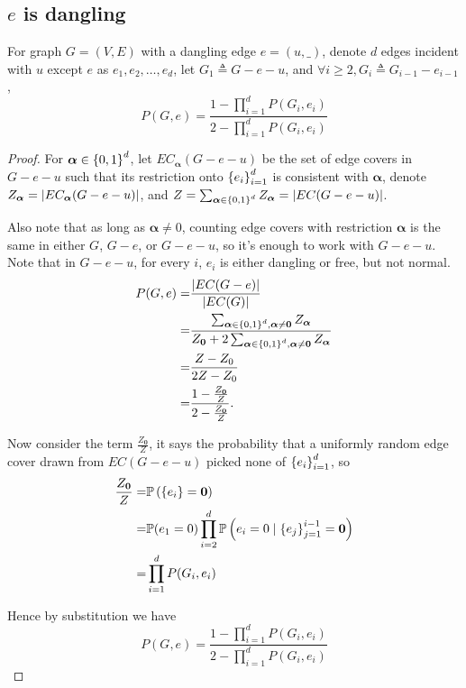 \subsection{$e$ is dangling}
\begin{lemma}
For graph $G=(V,E)$ with a dangling edge $e=(u,\_)$, denote $d$
edges incident with $u$ except $e$ as $e_1, e_2, \ldots, e_d$,
let $G_1 \triangleq G - e - u$, and $\forall i \geq 2, G_i \triangleq G_{i-1} - e_{i-1}$ ,
	\begin{equation}
		P(G, e) = \frac{1-\prod_{i=1}^d P(G_i, e_i)}{2 - \prod_{i=1}^d P(G_i, e_i)} %
		\label{propp3rg}
	\end{equation}
\end{lemma}
\begin{proof}
	For $\boldsymbol\alpha \in \left\{0,1\right\}^d$, let $EC_{\boldsymbol\alpha}(G-e-u)$ be the set of edge covers in $G-e-u$ such that its restriction onto $\left\{e_i\right\}_{i=1}^{d}$ is consistent with $\boldsymbol\alpha$, denote $Z_{\boldsymbol\alpha} = \left\vert EC_{\boldsymbol\alpha}(G-e-u)\right\vert$, and $Z = \sum_{\boldsymbol\alpha \in \left\{0,1\right\}^d} Z_{\boldsymbol\alpha} = \left\vert EC(G-e-u)\right\vert$. %

		Also note that as long as $\boldsymbol\alpha \neq 0$, counting edge covers with restriction $\boldsymbol\alpha$ is the same in either $G$, $G-e$, or $G-e-u$, so it's enough to work with $G-e-u$. Note that in $G-e-u$, for every $i$, $e_i$ is either dangling or free, but not normal.
	\begin{align*}
		P(G,e) = & \frac{\left\vert EC(G-e)\right\vert}{\left\vert EC(G)\right\vert} \\
        = & \frac{\sum_{\boldsymbol\alpha \in \left\{0,1\right\}^d, \boldsymbol\alpha \neq \mathbf{0}} Z_{\boldsymbol\alpha} }{ Z_{\mathbf{0}} + 2 \sum_{\boldsymbol\alpha \in \left\{0,1\right\}^d, \boldsymbol\alpha \neq \mathbf{0}} Z_{\boldsymbol\alpha}} \\
        = &\frac{Z - Z_0}{2 Z - Z_0} \\
        = &\frac{1 - \frac{Z_{\mathbf{0}}}{Z}}{ 2 - \frac{Z_{\mathbf{0}}}{Z}}.
	\end{align*}

	Now consider the term $\frac{Z_{\mathbf{0}}}{Z}$, it says the probability that a uniformly random edge cover drawn from $EC(G-e-u)$ picked none of $\left\{e_i\right\}_{i=1}^{d}$, so
	\begin{align*}
        \frac{Z_{\mathbf{0}}}{Z} = & \mathbb{P} \left( \left\{e_i\right\} = \mathbf{0}\right) \\
        = & \mathbb{P} (e_1 = 0) \prod_{i=2}^d \mathbb{P} \left(e_i = 0 \mid \left\{e_j\right\}_{j=1}^{i-1} =\mathbf{0}\right) \\
        = &\prod_{i=1}^d P(G_i, e_i)
	\end{align*}

	Hence by substitution we have
    $$P(G, e) = \frac{1-\prod_{i=1}^d P(G_i, e_i)}{2 - \prod_{i=1}^d P(G_i, e_i)}$$
	
\end{proof}

